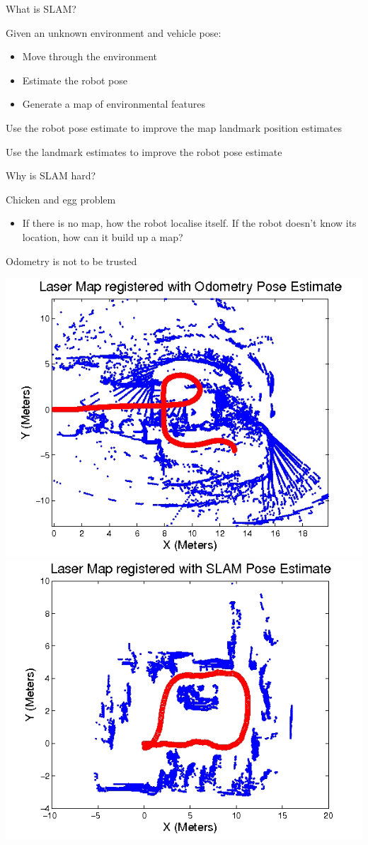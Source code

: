 \documentclass[compress]{beamer}
\begin{document}
\begin{frame}{What is SLAM?}

Given an unknown environment and vehicle pose:

\begin{itemize}
\item Move through the environment
\item Estimate the robot pose
\item Generate a map of environmental features
\end{itemize}

Use the robot pose estimate to improve the map landmark position
estimates

Use the landmark estimates to improve the robot pose estimate

\end{frame}

\begin{frame}{Why is SLAM hard?}

Chicken and egg problem

\begin{itemize}
\item If there is no map, how the robot localise itself. If the robot
  doesn't know its location, how can it build up a map?
\end{itemize}

Odometry is not to be trusted

    \begin{center}
        \includegraphics[width=0.4\linewidth]{slam1}
        \hspace{1em}
        \includegraphics[width=0.4\linewidth]{slam2}
    \end{center}
\end{frame}
\end{document}
